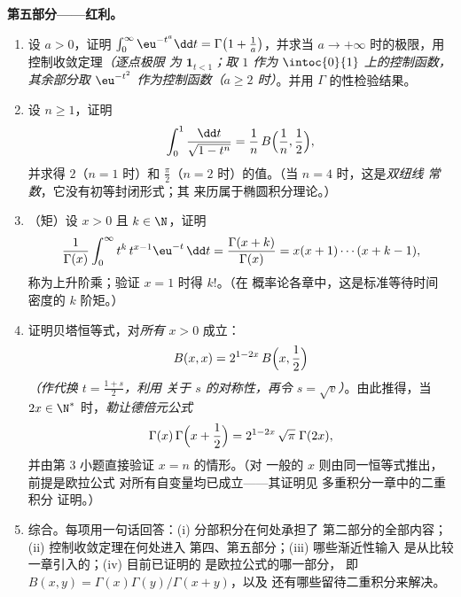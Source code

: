 \begin{problem}
\medskip
\noindent\textbf{第五部分——红利。}
\begin{enumerate}[resume]
  \item 设 $a > 0$，证明 $\int_0^\infty \eu^{-t^a}\dd t =
        \Gamma\bigl(1 + \frac1a\bigr)$，并求当
        $a \to +\infty$ 时的极限，用控制收敛定理\emph{（逐点极限
        为 $\mathbf 1_{t < 1}$；取 $1$ 作为 $\intoc{0}{1}$ 上的控制函数，
        其余部分取 $\eu^{-t^2}$ 作为控制函数（$a \geq
        2$ 时）}。并用
        $\Gamma$ 的性检验结果。
  \item 设 $n \geq 1$，证明
        \[
        \int_0^1 \frac{\dd t}{\sqrt{1 - t^n}}
        = \frac1n\,B\Bigl(\frac1n, \frac12\Bigr),
        \]
        并求得 $2$（$n = 1$ 时）和 $\frac\pi2$（$n
        = 2$ 时）的值。（当 $n = 4$ 时，这是\emph{双纽线
        常数}，它没有初等封闭形式；其
        来历属于椭圆积分理论。）
  \item （矩）设 $x > 0$ 且 $k \in \N$，证明
        \[
        \frac{1}{\Gamma(x)}\int_0^\infty
        t^{k}\,t^{x-1}\eu^{-t}\,\dd t
        = \frac{\Gamma(x+k)}{\Gamma(x)}
        = x(x+1)\cdots(x+k-1),
        \]
        称为上升阶乘；验证 $x = 1$ 时得 $k!$。（在
        概率论各章中，这是标准等待时间
        密度的 $k$ 阶矩。）
  \item 证明贝塔恒等式，对\emph{所有} $x > 0$ 成立：
        \[
        B(x, x) = 2^{1-2x}\,B\Bigl(x, \frac12\Bigr)
        \]
        \emph{（作代换 $t = \frac{1+s}2$，利用
        关于 $s$ 的对称性，再令 $s = \sqrt v$）}。由此推得，当
        $2x \in \N^*$ 时，\emph{勒让德倍元公式}
        \[
        \Gamma(x)\,\Gamma\Bigl(x + \frac12\Bigr)
        = 2^{1-2x}\,\sqrt\pi\;\Gamma(2x),
        \]
        并由第 3 小题直接验证 $x = n$ 的情形。（对
        一般的 $x$ 则由同一恒等式推出，前提是欧拉公式
        对所有自变量均已成立——其证明见
        多重积分一章中的二重积分
        证明。）
  \item 综合。每项用一句话回答：(i) 分部积分在何处承担了
        第二部分的全部内容；(ii) 控制收敛定理在何处进入
        第四、第五部分；(iii) 哪些渐近性输入
        是从比较一章引入的；(iv) 目前已证明的
        是欧拉公式的哪一部分，
        即 $B(x,y) = \Gamma(x)\Gamma(y)/\Gamma(x+y)$，以及
        还有哪些留待二重积分来解决。
\end{enumerate}
\end{problem}
